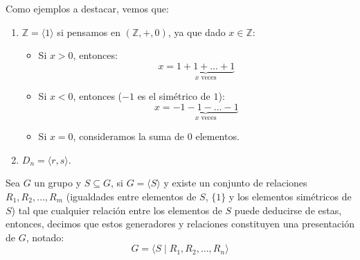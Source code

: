 \begin{ejemplo}
    Como ejemplos a destacar, vemos que:
    \begin{enumerate}
        \item $\mathbb{Z} = \langle 1 \rangle $ si pensamos en $(\mathbb{Z}, +, 0)$, ya que dado $x\in \mathbb{Z}$:
            \begin{itemize}
                \item Si $x>0$, entonces:
                    \begin{equation*}
                        x = \underbrace{1+1+\ldots +1}_{x \text{\ veces}}
                    \end{equation*}
                \item Si $x<0$, entonces ($-1$ es el simétrico de $1$):
                    \begin{equation*}
                        x = \underbrace{-1-1-\ldots-1}_{x \text{\ veces}}
                    \end{equation*}
                \item Si $x=0$, consideramos la suma de $0$ elementos.
            \end{itemize}
        \item $D_n = \langle r,s \rangle $.
    \end{enumerate}
\end{ejemplo}

\begin{definicion}
    Sea $G$ un grupo y $S\subseteq G$, si $G=\langle S \rangle $ y existe un conjunto de relaciones $R_1,R_2,\ldots,R_m$ (igualdades entre elementos de $S$, $\{1\}$ y los elementos simétricos de $S$) tal que cualquier relación entre los elementos de $S$ puede deducirse de estas, entonces, decimos que estos generadores y relaciones constituyen una presentación de $G$, notado:
    \begin{equation*}
        G=\langle S \mid R_1,R_2,\ldots, R_n \rangle 
    \end{equation*}
\end{definicion}

